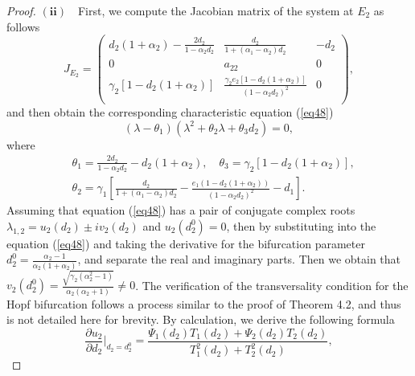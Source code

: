 \documentclass{ws-ijbc}
\begin{document}
\begin{proof}
$\mathbf{(ii)}$~~First, we compute the Jacobian matrix of the system at $E_{2}$ as follows
\begin{equation}\label{jaco5}
    J_{E_{2}}=\left(
   \begin{array}{ccc}
       d_{2}(1+\alpha_{2})-\frac{2d_{2}}{1-\alpha_{2}d_{2}} & \frac{d_{2}}{1+(\alpha_{1}-\alpha_{2})d_{2}} & -d_{2} \\
      0 & a_{22} & 0 \\
        \gamma_{2}\left[1-d_{2}(1+\alpha_{2})\right]& \frac{\gamma_{2}e_{2}[1-d_{2}(1+\alpha_{2})]}{(1-\alpha_{2}d_{2})^{2}} & 0 \\
     \end{array}
   \right),
\end{equation}
and then obtain the corresponding characteristic equation (\ref{eq48})
\begin{equation}\label{eq48}
(\lambda-\theta_{1})(\lambda^{2}+\theta_{2}\lambda+\theta_{3}d_{2})=0,
\end{equation}
where
\begin{equation*}
\begin{aligned}
&\theta_{1}=\frac{2d_{2}}{1-\alpha_{2}d_{2}}-d_{2}(1+\alpha_{2}),\quad \theta_{3}=\gamma_{2}\left[1-d_{2}(1+\alpha_{2})\right],\\
&\theta_{2}=\gamma_{1}\left[\frac{d_{2}}{1+(\alpha_{1}-\alpha_{2})d_{2}}-\frac{e_{1}(1-d_{2}(1+\alpha_{2}))}{(1-\alpha_{2}d_{2})^{2}}-d_{1}\right].
\end{aligned}
\end{equation*}
Assuming that equation (\ref{eq48}) has a pair of conjugate complex roots $\lambda_{1,2}=u_{2}(d_{2})\pm iv_{2}(d_{2})$ and $u_{2}(d_{2}^{0})=0$, then by substituting into the equation (\ref{eq48}) and taking the derivative for the bifurcation parameter $d_{2}^{0}=\frac{\alpha_{2}-1}{\alpha_{2}(1+\alpha_{2})}$, and separate the real and imaginary parts. Then we obtain that $
v_{2}(d_{2}^{0})=\frac{\sqrt{\gamma_{2}(\alpha_{2}^{2}-1)}}{\alpha_{2} \left(\alpha_{2} +1\right)}\neq0$.
The verification of the transversality condition for the Hopf bifurcation follows a process similar to the proof of Theorem 4.2, and thus is not detailed here for brevity. By calculation, we derive the following formula
\begin{equation}
 \frac{\partial u_{2}}{\partial d_{2}}|_{ d_2=d_{2}^{0}}=\frac{\Psi_{1}(d_{2})T_{1}(d_{2})+\Psi_{2}(d_{2})T_{2}(d_{2})}{T_{1}^{2}(d_{2})+T_{2}^{2}(d_{2})},
\end{equation}

\end{proof}
\end{document}
